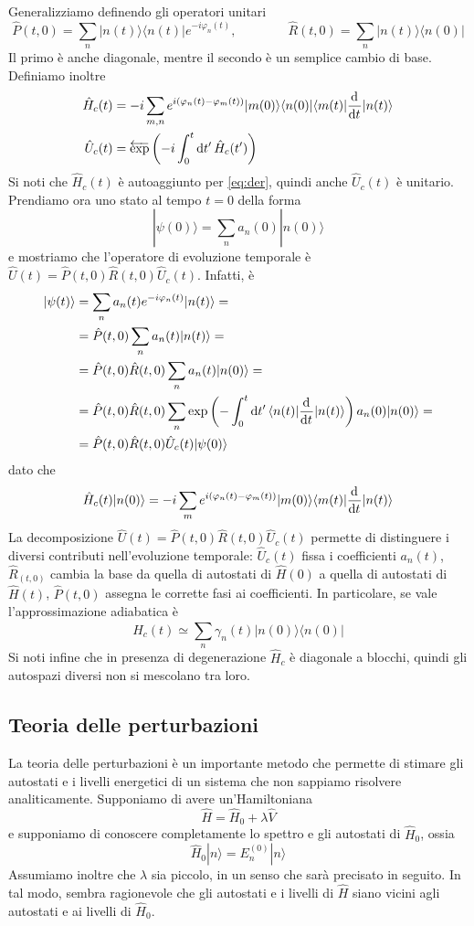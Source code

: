 \documentclass[a4paper, 11pt]{article}
\newcommand{\op}[1]{\hat{#1}}
\renewcommand{\op}[1]{\hat{#1}}
\newcommand{\ham}{\hat{H}}
\renewcommand{\ket}[1]{| #1\rangle}
\renewcommand{\bra}[1]{\langle #1|}
\begin{document}
Generalizziamo definendo gli operatori unitari
\[\op{P}(t,0)=\sum_{n}\ket{n(t)}\bra {n(t)}e^{-i\varphi_n(t)},\qquad\qquad \op R(t,0)=\sum_{n}\ket{n(t)}\bra {n(0)}\]
Il primo è anche diagonale, mentre il secondo è un semplice cambio di base. Definiamo inoltre
\begin{align*}
	\ham_c(t)&=-i\sum_{m,n}e^{i(\varphi_n(t)-\varphi_m(t))}\ket{m(0)}\bra {n(0)}\braketop{m(t)}{\der{}{t}}{n(t)}\\\op U_c(t)&=\overleftarrow{\exp}\left(-i\int_{0}^{t}\d t'\,\ham_c(t')\right)
\end{align*}
Si noti che $\ham_c(t)$ è autoaggiunto per \ref{eq:der}, quindi anche $\op U_c(t)$ è unitario. Prendiamo ora uno stato al tempo $t=0$ della forma
\[\ket{\psi(0)}=\sum_{n}a_n(0)\ket{n(0)}\]
e mostriamo che l'operatore di evoluzione temporale è $\op U(t)=\op P(t,0)\op R(t,0)\op U_c(t)$. Infatti, è
\begin{align*}
	\ket{\psi(t)}&=\sum_{n}a_n(t)e^{-i\varphi_n(t)}\ket{n(t)}=\\&=
	\op P(t,0)\sum_{n}a_n(t)\ket{n(t)}=\\&=\op P(t,0)\op R(t,0)\sum_{n}a_n(t)\ket{n(0)}=\\&=\op P(t,0)\op R(t,0)\sum_{n}\exp\left(-\int_{0}^{t}\d t'\,\braketop{n(t)}{\der{}{t}}{n(t)}\right)a_n(0)\ket{n(0)}=\\&=\op P(t,0)\op R(t,0)\op U_c(t)\ket{\psi(0)}
\end{align*}
dato che
\[\ham_c(t)\ket{n(0)}=-i\sum_{m}e^{i(\varphi_n(t)-\varphi_m(t))}\ket{m(0)}\braketop{m(t)}{\der{}{t}}{n(t)}\]
La decomposizione $\op U(t)=\op P(t,0)\op R(t,0)\op U_c(t)$ permette di distinguere i diversi contributi nell'evoluzione temporale: $\op U_c(t)$ fissa i coefficienti $a_n(t)$, $\op R_(t,0)$ cambia la base da quella di autostati di $\ham(0)$ a quella di autostati di $\ham(t)$, $\op P(t,0)$ assegna le corrette fasi ai coefficienti. In particolare, se vale l'approssimazione adiabatica è
\[\ham_c(t)\simeq\sum_{n}\gamma_n(t)\ket{n(0)}\bra {n(0)}\]
Si noti infine che in presenza di degenerazione $\ham_c$ è diagonale a blocchi, quindi gli autospazi diversi non si mescolano tra loro.
\subsection{Teoria delle perturbazioni}
La teoria delle perturbazioni è un importante metodo che permette di stimare gli autostati e i livelli energetici di un sistema che non sappiamo risolvere analiticamente. Supponiamo di avere un'Hamiltoniana
\[\ham=\ham_0+\lambda \op V\]
e supponiamo di conoscere completamente lo spettro e gli autostati di $\ham_0$, ossia
\[\ham_0\ket{n}=E_n^{(0)}\ket{n}\] Assumiamo inoltre che $\lambda$ sia piccolo, in un senso che sarà precisato in seguito.  In tal modo, sembra ragionevole che gli autostati e i livelli di $\ham$ siano vicini agli autostati e ai livelli di $\ham_0$. 
\end{document}
